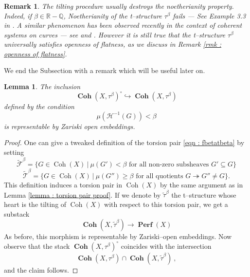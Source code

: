 \documentclass[11pt]{article}
\newtheorem{lemma}[theorem]{Lemma}
\newtheorem{remark}[theorem]{Remark}
\newcommand{\BR}{\mathbb{R}}
\newcommand{\BQ}{\mathbb{Q}}
\newcommand{\coh}{\operatorname{Coh}}
\newcommand{\perfstack}{\boldsymbol{\operatorname{Perf}}(X)}
\newcommand{\cohflat}{\boldsymbol{\operatorname{Coh}}}
\begin{document}
\begin{remark}\label{rmk : noeth fails if beta is not rational}
    The tilting procedure usually destroys the noetherianity property. Indeed, if $\beta\in \BR - \BQ$, Noetherianity of the t--structure $\tau^\beta$ fails --- See Example 3.3 in \cite{Rota_2021}. A similar phenomenon has been observed recently in the context of coherent systems on curves --- see \cite{feyzbakhsh2025derivedcategorycoherentsystems} and \cite{jardim2025stabilityconditionscoherentsystems}. However it is still true that the t--structure $\tau^\beta$ universally satisfies openness of flatness, as we discuss in Remark \ref{rmk : openness of flatness}. 
\end{remark}
\bigskip

\noindent We end the Subsection with a remark which will be useful later on. 

\begin{lemma}\label{lemma : cohbetacirc}
    The inclusion
    \begin{equation}\label{eqn : cohbetacirc}
        \cohflat(X,\tau^\beta)^\circ \hookrightarrow \cohflat(X,\tau^{\beta})
    \end{equation}
    defined by the condition
    \[
        \mu(\mathcal{H}^{-1}(G))<\beta  
    \]
    is representable by Zariski open embeddings.
\end{lemma}

\begin{proof}
    One can give a tweaked definition of the torsion pair \eqref{eqn : fbetatbeta} by setting
\begin{equation}\label{eqn : tweaked tp}
    \widetilde{\mathcal{F}}^{\beta}=\{ G\in \operatorname{Coh}(X) \ |\ \mu(G')< \beta \text{ for all non-zero subsheaves } G'\subseteq G \} 
\end{equation}
\[
\widetilde{\mathcal{T}}^{\beta}=\{ G\in \operatorname{Coh}(X) \ |\ \mu(G'') \geq \beta \text{ for all quotients } G \twoheadrightarrow G''\neq G \}.
\]
This definition induces a torsion pair in $\coh(X)$ by the same argument as in Lemma \ref{lemma : torsion pair proof}. If we denote by $\widetilde{\tau}^\beta$ the t--structure whose heart is the tilting of $\coh(X)$ with respect to this torsion pair, we get a substack
\[
    \cohflat(X,\widetilde{\tau}^{\beta}) \longrightarrow \perfstack
\]
As before, this morphism is representable by Zariski--open embeddings. Now observe that the stack $\cohflat(X,\tau^\beta)^\circ$ coincides with the intersection
\[
    \cohflat(X,\tau^{\beta}) \cap \cohflat(X,\widetilde{\tau}^{\beta})\ ,
\]
and the claim follows.
\end{proof}
\end{document}
